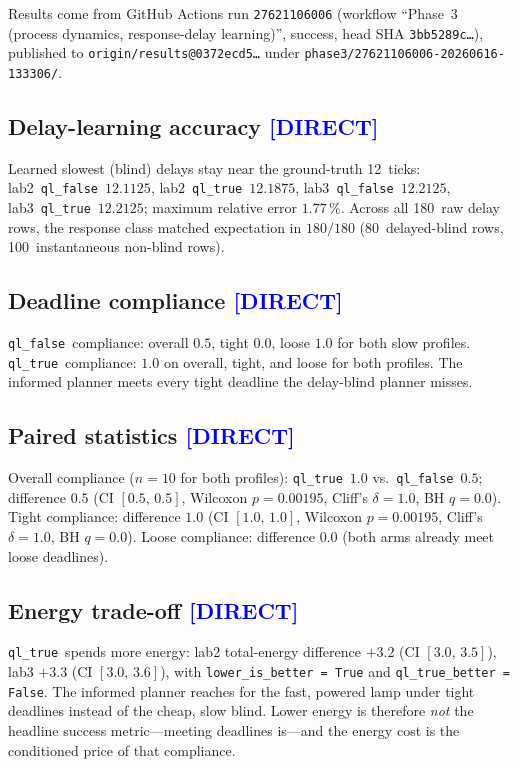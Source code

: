 \documentclass[12pt, a4paper, oneside]{memoir}
\newcommand{\evDirect}{\textcolor{blue}{[DIRECT]}}
\newcommand{\qlT}{\texttt{ql\_true}}
\newcommand{\qlF}{\texttt{ql\_false}}
\begin{document}
Results come from GitHub Actions run \texttt{27621106006} (workflow
\enquote{Phase~3 (process dynamics, response-delay learning)}, success, head
SHA \texttt{3bb5289c\ldots}), published to
\texttt{origin/results@0372ecd5\ldots} under
\texttt{phase3/27621106006-20260616-133306/}.

\subsection{Delay-learning accuracy \evDirect}

Learned slowest (blind) delays stay near the ground-truth 12~ticks:
lab2~\qlF\ $12.1125$, lab2~\qlT\ $12.1875$,
lab3~\qlF\ $12.2125$, lab3~\qlT\ $12.2125$;
maximum relative error $1.77\,\%$.
Across all 180~raw delay rows, the response class matched expectation in
$180/180$ (80~delayed-blind rows, 100~instantaneous non-blind rows).

\subsection{Deadline compliance \evDirect}

\qlF\ compliance: overall $0.5$, tight $0.0$, loose $1.0$ for both slow
profiles.  \qlT\ compliance: $1.0$ on overall, tight, and loose for both
profiles.  The informed planner meets every tight deadline the delay-blind
planner misses.

\subsection{Paired statistics \evDirect}

Overall compliance ($n = 10$ for both profiles): \qlT\ $1.0$ vs.\ \qlF\
$0.5$; difference $0.5$ (CI $[0.5,\,0.5]$, Wilcoxon $p = 0.00195$, Cliff's
$\delta = 1.0$, BH $q = 0.0$).  Tight compliance: difference $1.0$
(CI $[1.0,\,1.0]$, Wilcoxon $p = 0.00195$, Cliff's $\delta = 1.0$, BH
$q = 0.0$).  Loose compliance: difference $0.0$ (both arms already meet loose
deadlines).

\subsection{Energy trade-off \evDirect}

\qlT\ spends more energy: lab2 total-energy difference $+3.2$
(CI $[3.0,\,3.5]$), lab3 $+3.3$ (CI $[3.0,\,3.6]$), with
\texttt{lower\_is\_better = True} and \texttt{ql\_true\_better = False}.
The informed planner reaches for the fast, powered lamp under tight deadlines
instead of the cheap, slow blind.  Lower energy is therefore \emph{not} the
headline success metric---meeting deadlines is---and the energy cost is the
conditioned price of that compliance.
\end{document}
